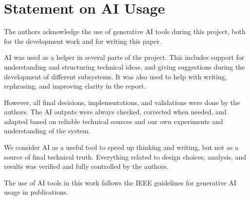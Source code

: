 \section*{Statement on AI Usage}
The authors acknowledge the use of generative AI tools during this project, both for the development work and for writing this paper.

AI was used as a helper in several parts of the project. This includes support for understanding and structuring technical ideas, and giving suggestions during the development of different subsystems. It was also used to help with writing, rephrasing, and improving clarity in the report.

However, all final decisions, implementations, and validations were done by the authors. The AI outputs were always checked, corrected when needed, and adapted based on reliable technical sources and our own experiments and understanding of the system.

We consider AI as a useful tool to speed up thinking and writing, but not as a source of final technical truth. Everything related to design choices, analysis, and results was verified and fully controlled by the authors.

The use of AI tools in this work follows the IEEE guidelines for generative AI usage in publications.




